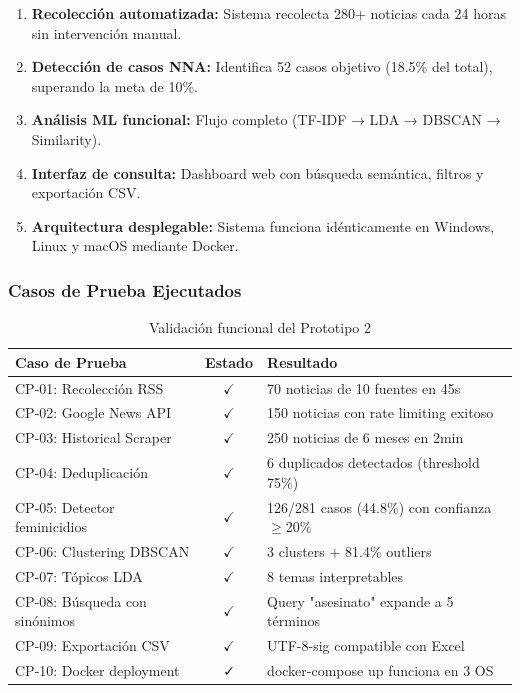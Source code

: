 \begin{enumerate}
    \item \textbf{Recolección automatizada:}  Sistema recolecta 280+ noticias cada 24 horas sin intervención manual.
    \item \textbf{Detección de casos NNA:}  Identifica 52 casos objetivo (18.5\% del total), superando la meta de 10\%.
    \item \textbf{Análisis ML funcional:}  Flujo completo (TF-IDF → LDA → DBSCAN → Similarity).
    \item \textbf{Interfaz de consulta:} Dashboard web con búsqueda semántica, filtros y exportación CSV.
    \item \textbf{Arquitectura desplegable:}  Sistema funciona idénticamente en Windows, Linux y macOS mediante Docker.
\end{enumerate}

\subsubsection{Casos de Prueba Ejecutados}

\begin{table}[h]
\centering
\caption{Validación funcional del Prototipo 2}
\begin{tabular}{|l|c|p{6cm}|}
\hline
\textbf{Caso de Prueba} & \textbf{Estado} & \textbf{Resultado} \\ \hline
CP-01: Recolección RSS & $\checkmark$ & 70 noticias de 10 fuentes en 45s \\ \hline
CP-02: Google News API & $\checkmark$ & 150 noticias con rate limiting exitoso \\ \hline
CP-03: Historical Scraper & $\checkmark$ & 250 noticias de 6 meses en 2min \\ \hline
CP-04: Deduplicación & $\checkmark$ & 6 duplicados detectados (threshold 75\%) \\ \hline
CP-05: Detector feminicidios & $\checkmark$ & 126/281 casos (44.8\%) con confianza $\geq$20\% \\ \hline
CP-06: Clustering DBSCAN & $\checkmark$ & 3 clusters + 81.4\% outliers \\ \hline
CP-07: Tópicos LDA & $\checkmark$ & 8 temas interpretables \\ \hline
CP-08: Búsqueda con sinónimos & $\checkmark$ & Query "asesinato" expande a 5 términos \\ \hline
CP-09: Exportación CSV & $\checkmark$ & UTF-8-sig compatible con Excel \\ \hline
CP-10: Docker deployment & ✓ & docker-compose up funciona en 3 OS \\ \hline
\end{tabular}
\end{table}


